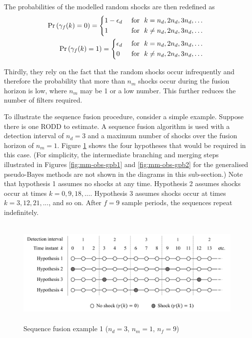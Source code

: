 The probabilities of the modelled random shocks are then redefined as
\begin{equation} \label{eq:Pr_gamma_nd}
	\begin{aligned}
		\Pr\left(\gamma_{f}(k)=0\right) = \begin{cases*}
			1 - \epsilon_d & \text { for } $k = n_d, 2n_d, 3n_d, \ldots$ \\
			1 & \text { for } $k \ne n_d, 2n_d, 3n_d, \ldots$
		\end{cases*} \\
		\Pr\left(\gamma_{f}(k)=1\right) = \begin{cases*}
			\epsilon_d & \text { for } $k = n_d, 2n_d, 3n_d, \ldots$ \\
			0 & \text { for } $k \ne n_d, 2n_d, 3n_d, \ldots$
		\end{cases*} \\
	\end{aligned}
\end{equation}

Thirdly, they rely on the fact that the random shocks occur infrequently and therefore the probability that more than $n_m$ shocks occur during the fusion horizon is low, where $n_m$ may be 1 or a low number. This further reduces the number of filters required.

To illustrate the sequence fusion procedure, consider a simple example. Suppose there is one RODD to estimate. A sequence fusion algorithm is used with a detection interval of $n_d=3$ and a maximum number of shocks over the fusion horizon of $n_m=1$. Figure \ref{fig:mm-obs-seq-rob1} shows the four hypotheses that would be required in this case. (For simplicity, the intermediate branching and merging steps illustrated in Figures \ref{fig:mm-obs-gpb1} and \ref{fig:mm-obs-gpb2} for the generalised pseudo-Bayes methods are not shown in the diagrams in this sub-section.) Note that hypothesis 1 assumes no shocks at any time. Hypothesis 2 assumes shocks occur at times $k=0,9,18,...$. Hypothesis 3 assumes shocks occur at times $k=3,12,21,...$, and so on. After $f=9$ sample periods, the sequences repeat indefinitely.

\begin{figure}[htp]
	\centering
	\includegraphics[height=5.3cm]{images/mm_obs_seq_rob1.pdf}
	\caption{Sequence fusion example 1 ($n_d=3$, $n_m=1$, $n_f=9$)}
	\label{fig:mm-obs-seq-rob1}
\end{figure}

